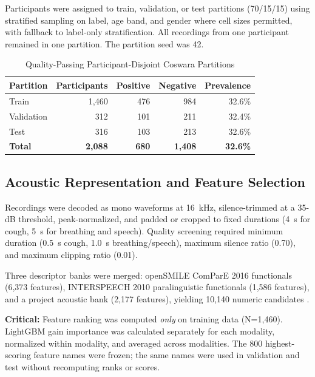 \documentclass[conference]{IEEEtran}
\begin{document}
Participants were assigned to train, validation, or test partitions (70/15/15) using stratified sampling on label, age band, and gender where cell sizes permitted, with fallback to label-only stratification. All recordings from one participant remained in one partition. The partition seed was 42.

\begin{table}[!b]
\caption{Quality-Passing Participant-Disjoint Coswara Partitions}
\label{tab:cohort}
\centering
\footnotesize
\begin{tabular}{lrrrr}
\toprule
Partition & Participants & Positive & Negative & Prevalence \\
\midrule
Train      & 1,460 & 476 & 984 & 32.6\% \\
Validation &   312 & 101 & 211 & 32.4\% \\
Test       &   316 & 103 & 213 & 32.6\% \\
\midrule
\textbf{Total} & \textbf{2,088} & \textbf{680} & \textbf{1,408} & \textbf{32.6\%} \\
\bottomrule
\end{tabular}
\end{table}

\subsection{Acoustic Representation and Feature Selection}

Recordings were decoded as mono waveforms at 16~kHz, silence-trimmed at a 35-dB threshold, peak-normalized, and padded or cropped to fixed durations (4~s for cough, 5~s for breathing and speech). Quality screening required minimum duration (0.5~s cough, 1.0~s breathing/speech), maximum silence ratio (0.70), and maximum clipping ratio (0.01).

Three descriptor banks were merged: openSMILE ComParE 2016 functionals (6,373 features), INTERSPEECH 2010 paralinguistic functionals (1,586 features), and a project acoustic bank (2,177 features), yielding 10,140 numeric candidates \cite{eyben2010opensmile,schuller2010is10,schuller2013compare}.

\textbf{Critical:} Feature ranking was computed \emph{only} on training data (N=1,460). LightGBM gain importance was calculated separately for each modality, normalized within modality, and averaged across modalities. The 800 highest-scoring feature names were frozen; the same names were used in validation and test without recomputing ranks or scores.
\end{document}
